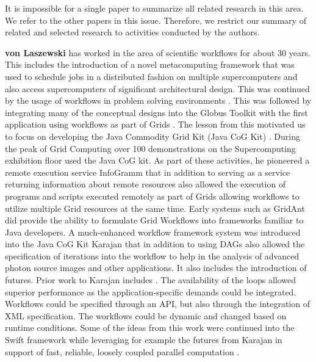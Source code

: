 \documentclass[utf8]{FrontiersinVancouver} %
\begin{document}
It is impossible for a single paper to summarize all related research in this area. We refer to the other papers in this issue. Therefore, we restrict our summary of related and selected research to activities conducted by the authors.

{\bf von Laszewski} has worked in the area of scientific workflows for about 30 years. This includes the introduction of a novel metacomputing framework \citep{las-99-loosely,las-94-ecwmf,las-96-ecwmf} that was used to schedule jobs in a distributed fashion on multiple supercomputers and also access supercomputers of significant architectural design. 
This was continued by the usage of workflows in problem solving environments \citep{las-01-pse}. This was followed by integrating many of the conceptual designs into the Globus Toolkit with the first application using workflows as part of Grids \citep{las-00-sbc}. The lesson from this motivated us to focus on developing the Java Commodity Grid Kit (Java CoG Kit) \citep{las-06-workcoordination,
las-06-workflow-book,
las-06-exp-a,
las-05-workflowrepo,
las-05-workflow-jgc,
las-05-exp,
las-04-abstraction-j,
las-03-gridcomputing,
las-02-javacog,
las-00-grande,
las-01-cog-concurency}. 
During the peak of Grid Computing over 100 demonstrations on the Supercomputing exhibition floor used the Java CoG kit. As part of these activities, he pioneered a remote execution service InfoGramm 
\citep{las-02-infogram}
that in addition to serving as a service returning information about remote resources also allowed the execution of programs and scripts executed remotely as part of Grids allowing workflows to utilize multiple Grid resources at the same time. Early systems such as GridAnt \citep{las-04-gridant} 
did provide the ability to formulate Grid Workflows into frameworks familiar to Java developers. A much-enhanced workflow framework system was introduced into the  Java CoG Kit Karajan \citep{las-06-workflow-book} that in addition to using DAGs also allowed the specification of iterations into the workflow to help in the analysis of advanced photon source images and other applications. It also includes the introduction of futures. Prior work to Karajan includes \citep{las-04-gridant,las-01-cog-concurency,las-96-ecwmf}. The availability of the loops allowed superior performance as the application-specific demands could be integrated. Workflows could be specified through an API, but also through the integration of XML specification. The workflows could be dynamic and changed based on runtime conditions. Some of the ideas from this work were continued into the Swift framework while leveraging for example the futures from Karajan in support of fast, reliable, loosely coupled parallel computation \citep{las--7-swift}. 
\end{document}
